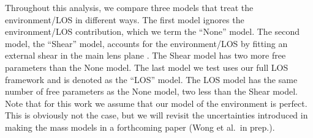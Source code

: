 Throughout this analysis, we compare three models that treat the environment/LOS in different ways. The first model ignores the environment/LOS contribution, which we term the ``None'' model. The second model, the ``Shear'' model, accounts for the environment/LOS by fitting an external shear in the main lens plane \citep[e.g.,][]{Suyu13}. The Shear model has two more free parameters than the None model. The last model we test uses our full LOS framework and is denoted as the ``LOS'' model. The LOS model has the same number of free parameters as the None model, two less than the Shear model. Note that for this work we assume that our model of the environment is perfect. This is obviously not the case, but we will revisit the uncertainties introduced in making the mass models in a forthcoming paper (Wong et al.~in prep.).